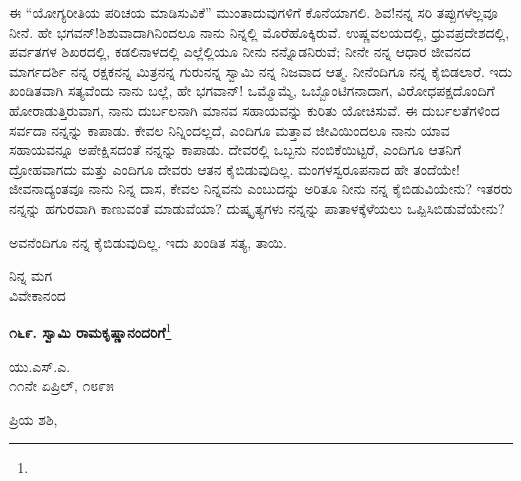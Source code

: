 \vspace{0.15cm}

ಈ “ಯೋಗ್ಯರೀತಿಯ ಪರಿಚಯ ಮಾಡಿಸುವಿಕೆ” ಮುಂತಾದುವುಗಳಿಗೆ ಕೊನೆಯಾಗಲಿ. ಶಿವ!ನನ್ನ ಸರಿ ತಪ್ಪುಗಳೆಲ್ಲವೂ ನೀನೆ. ಹೇ ಭಗವನ್!ಶಿಶುವಾದಾಗಿನಿಂದಲೂ ನಾನು ನಿನ್ನಲ್ಲಿ ಮೊರೆಹೊಕ್ಕಿರುವೆ. ಉಷ್ಣವಲಯದಲ್ಲಿ, ಧ್ರುವಪ್ರದೇಶದಲ್ಲಿ, ಪರ್ವತಗಳ ಶಿಖರದಲ್ಲಿ, ಕಡಲಿನಾಳದಲ್ಲಿ ಎಲ್ಲೆಲ್ಲಿಯೂ ನೀನು ನನ್ನೊಡನಿರುವೆ; ನೀನೇ ನನ್ನ ಆಧಾರ\enginline{-} ಜೀವನದ\enginline{-} ಮಾರ್ಗದರ್ಶಿ\enginline{-} ನನ್ನ ರಕ್ಷಕ\enginline{-}ನನ್ನ ಮಿತ್ರ\enginline{-}ನನ್ನ ಗುರು\enginline{-}ನನ್ನ ಸ್ವಾಮಿ\enginline{-} ನನ್ನ ನಿಜವಾದ ಆತ್ಮ. ನೀನೆಂದಿಗೂ ನನ್ನ ಕೈಬಿಡಲಾರೆ. ಇದು ಖಂಡಿತವಾಗಿ ಸತ್ಯವೆಂದು ನಾನು ಬಲ್ಲೆ, ಹೇ ಭಗವಾನ್! ಒಮ್ಮೊಮ್ಮೆ, ಒಬ್ಬೊಂಟಿಗನಾದಾಗ, ವಿರೋಧಪಕ್ಷದೊಂದಿಗೆ ಹೋರಾಡುತ್ತಿರುವಾಗ, ನಾನು ದುರ್ಬಲನಾಗಿ ಮಾನವ ಸಹಾಯವನ್ನು ಕುರಿತು ಯೋಚಿಸುವೆ. ಈ ದುರ್ಬಲತೆಗಳಿಂದ ಸರ್ವದಾ ನನ್ನನ್ನು ಕಾಪಾಡು. ಕೇವಲ ನಿನ್ನಿಂದಲ್ಲದೆ, ಎಂದಿಗೂ ಮತ್ತಾವ ಜೀವಿಯಿಂದಲೂ ನಾನು ಯಾವ ಸಹಾಯವನ್ನೂ ಅಪೇಕ್ಷಿಸದಂತೆ ನನ್ನನ್ನು ಕಾಪಾಡು. ದೇವರಲ್ಲಿ ಒಬ್ಬನು ನಂಬಿಕೆಯಿಟ್ಟರೆ, ಎಂದಿಗೂ ಆತನಿಗೆ ದ್ರೋಹವಾಗದು ಮತ್ತು ಎಂದಿಗೂ ದೇವರು ಆತನ ಕೈಬಿಡುವುದಿಲ್ಲ. ಮಂಗಳಸ್ವರೂಪನಾದ ಹೇ ತಂದೆಯೇ! ಜೀವನಾದ್ಯಂತವೂ ನಾನು ನಿನ್ನ ದಾಸ, ಕೇವಲ ನಿನ್ನವನು ಎಂಬುದನ್ನು ಅರಿತೂ ನೀನು ನನ್ನ ಕೈಬಿಡುವಿಯೇನು? ಇತರರು ನನ್ನನ್ನು ಹಗುರವಾಗಿ ಕಾಣುವಂತೆ ಮಾಡುವೆಯಾ? ದುಷ್ಕೃತ್ಯಗಳು ನನ್ನನ್ನು ಪಾತಾಳಕ್ಕೆಳೆಯಲು ಒಪ್ಪಿಸಿಬಿಡುವೆಯೇನು?

\vspace{0.15cm}

ಅವನೆಂದಿಗೂ ನನ್ನ ಕೈಬಿಡುವುದಿಲ್ಲ. ಇದು ಖಂಡಿತ ಸತ್ಯ, ತಾಯಿ.

{\flushright
ನಿನ್ನ ಮಗ\\ವಿವೇಕಾನಂದ\par}

\newpage

\begin{center}
\textbf{೧೬೯. ಸ್ವಾಮಿ ರಾಮಕೃಷ್ಣಾನಂದರಿಗೆ}\footnote{}
\end{center}

\vspace{-0.8cm}

\begin{flushright}
ಯು.ಎಸ್.ಎ.\\೧೧ನೇ ಏಪ್ರಿಲ್, ೧೮೯೫
\end{flushright}

\vspace{-0.5cm}

\noindent
ಪ್ರಿಯ ಶಶಿ,


